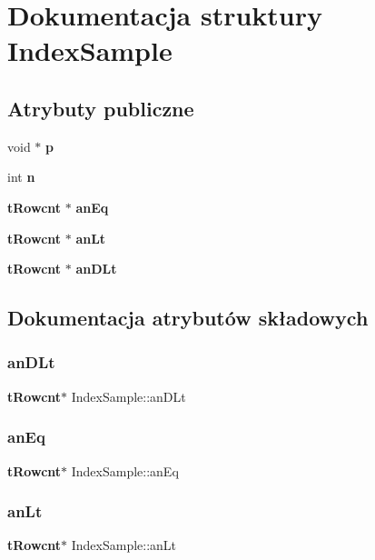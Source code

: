 \section{Dokumentacja struktury Index\+Sample}
\label{struct_index_sample}
\subsection*{Atrybuty publiczne}
\begin{DoxyCompactItemize}
\item 
void $\ast$ \textbf{ p}
\item 
int \textbf{ n}
\item 
\textbf{ t\+Rowcnt} $\ast$ \textbf{ an\+Eq}
\item 
\textbf{ t\+Rowcnt} $\ast$ \textbf{ an\+Lt}
\item 
\textbf{ t\+Rowcnt} $\ast$ \textbf{ an\+D\+Lt}
\end{DoxyCompactItemize}


\subsection{Dokumentacja atrybutów składowych}
\mbox{\label{struct_index_sample_ab17baab68e2890d9939c3840987051c2}} 
\subsubsection{anDLt}
{\footnotesize\ttfamily \textbf{ t\+Rowcnt}$\ast$ Index\+Sample\+::an\+D\+Lt}

\mbox{\label{struct_index_sample_a048e60e638c6e0305812102366822e67}} 
\subsubsection{anEq}
{\footnotesize\ttfamily \textbf{ t\+Rowcnt}$\ast$ Index\+Sample\+::an\+Eq}

\mbox{\label{struct_index_sample_a4853d16cdb7cf5099e8478471ae729de}} 
\subsubsection{anLt}
{\footnotesize\ttfamily \textbf{ t\+Rowcnt}$\ast$ Index\+Sample\+::an\+Lt}

